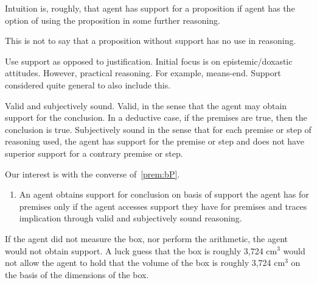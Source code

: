 \begin{note}[Support]
  Intuition is, roughly, that agent has support for a proposition if agent has the option of using the proposition in some further reasoning.

  This is not to say that a proposition without support has no use in reasoning.

  Use support as opposed to justification.
  Initial focus is on epistemic/doxastic attitudes.
  However, practical reasoning.
  For example, means-end.
  Support considered quite general to also include this.
\end{note}

\begin{note}
  Valid and subjectively sound.
  Valid, in the sense that the agent may obtain support for the conclusion.
  In a deductive case, if the premises are true, then the conclusion is true.
  Subjectively sound in the sense that for each premise or step of reasoning used, the agent has support for the premise or step and does not have superior support for a contrary premise or step.
\end{note}

\begin{note}[Focus]
Our interest is with the converse of~\ref{prem:bP}.

\begin{enumerate}[label=\mp{}, ref=\mp{}]
\item\label{denied-claim} An agent obtains support for conclusion on basis of support the agent has for premises only if the agent accesses support they have for premises and traces implication through valid and subjectively sound reasoning.
\end{enumerate}
If the agent did not measure the box, nor perform the arithmetic, the agent would not obtain support.
A luck guess that the box is roughly 3,724 cm\(^{3}\) would not allow the agent to hold that the volume of the box is roughly 3,724 cm\(^{3}\) on the basis of the dimensions of the box.
\end{note}

